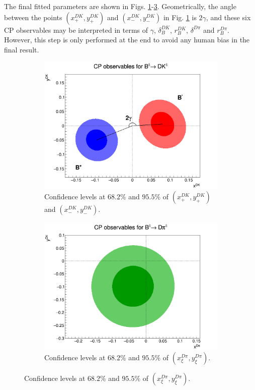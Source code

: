 \documentclass[12pt, a4paper, notitlepage, onecolumn]{article}
\numberwithin{equation}{section}
\begin{document}
The final fitted parameters are shown in Figs. \ref{fig_xpm_ypm}-\ref{fig_xxi_yxi}. Geometrically, the angle between the points $(x_+^{DK}, y_+^{DK})$ and $(x_-^{DK}, y_-^{DK})$ in Fig. \ref{fig_xpm_ypm} is $2\gamma$, and these six CP observables may be interpreted in terms of $\gamma$, $\delta_B^{DK}$, $r_B^{DK}$, $\delta^{D\pi}$ and $r_B^{D\pi}$. However, this step is only performed at the end to avoid any human bias in the final result.

\begin{figure}[H] 
  \centering
  \begin{subfigure}{0.5\textwidth}
    \centering
    \includegraphics[width=1\textwidth]{Plots/CPContours.png}
    \caption{Confidence levels at $68.2\%$ and $95.5\%$ of $(x_+^{DK}, y_+^{DK})$ and $(x_-^{DK}, y_-^{DK})$.}
    \label{fig_xpm_ypm}
  \end{subfigure}%
  \begin{subfigure}{0.5\textwidth}
    \centering
    \includegraphics[width=1\textwidth]{Plots/CPXiContours.png}
  \caption{Confidence levels at $68.2\%$ and $95.5\%$ of $(x_\xi^{D\pi}, y_\xi^{D\pi})$.}
    \label{fig_xxi_yxi}
  \end{subfigure}
\end{figure}
\end{document}
